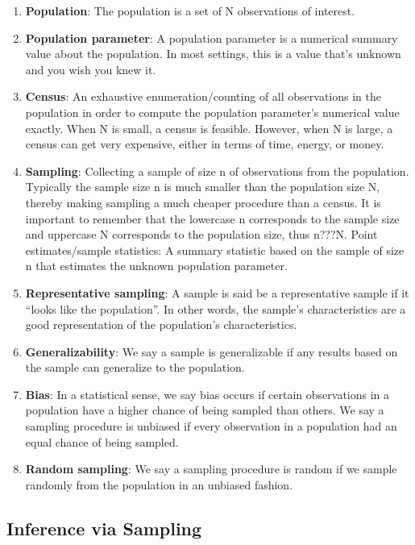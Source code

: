 \documentclass[]{article}
\begin{document}
\begin{enumerate}
\def\labelenumi{\arabic{enumi}.}
\item
  \textbf{Population}: The population is a set of N observations of
  interest.
\item
  \textbf{Population parameter}: A population parameter is a numerical
  summary value about the population. In most settings, this is a value
  that's unknown and you wish you knew it.
\item
  \textbf{Census}: An exhaustive enumeration/counting of all
  observations in the population in order to compute the population
  parameter's numerical value exactly. When N is small, a census is
  feasible. However, when N is large, a census can get very expensive,
  either in terms of time, energy, or money.
\item
  \textbf{Sampling}: Collecting a sample of size n of observations from
  the population. Typically the sample size n is much smaller than the
  population size N, thereby making sampling a much cheaper procedure
  than a census. It is important to remember that the lowercase n
  corresponds to the sample size and uppercase N corresponds to the
  population size, thus n???N. Point estimates/sample statistics: A
  summary statistic based on the sample of size n that estimates the
  unknown population parameter.
\item
  \textbf{Representative sampling}: A sample is said be a representative
  sample if it ``looks like the population''. In other words, the
  sample's characteristics are a good representation of the population's
  characteristics.
\item
  \textbf{Generalizability}: We say a sample is generalizable if any
  results based on the sample can generalize to the population.
\item
  \textbf{Bias}: In a statistical sense, we say bias occurs if certain
  observations in a population have a higher chance of being sampled
  than others. We say a sampling procedure is unbiased if every
  observation in a population had an equal chance of being sampled.
\item
  \textbf{Random sampling}: We say a sampling procedure is random if we
  sample randomly from the population in an unbiased fashion.
\end{enumerate}

\subsection{Inference via Sampling}\label{inference-via-sampling}
\end{document}
